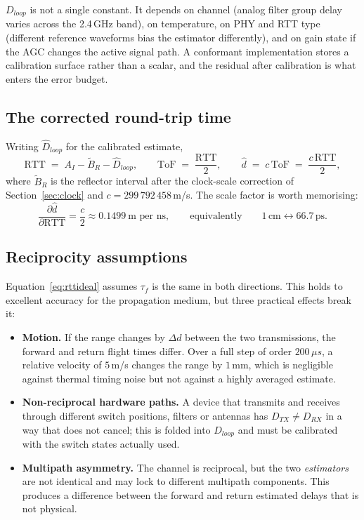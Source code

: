 \documentclass[11pt,a4paper]{article}
\newcommand{\us}{\,\ensuremath{\upmu}s}
\newcommand{\ToF}{\mathrm{ToF}}
\newcommand{\RTT}{\mathrm{RTT}}
\providecommand{\upmu}{\mu}
\begin{document}
$D_{loop}$ is not a single constant. It depends on channel (analog filter group delay varies across
the 2.4\,GHz band), on temperature, on PHY and RTT type (different reference waveforms bias the
estimator differently), and on gain state if the AGC changes the active signal path. A conformant
implementation stores a calibration surface rather than a scalar, and the residual after
calibration is what enters the error budget.

\subsection{The corrected round-trip time}

Writing $\hat D_{loop}$ for the calibrated estimate,
\begin{equation}
\RTT \;=\; A_I - \tilde B_R - \hat D_{loop},
\qquad
\ToF \;=\; \frac{\RTT}{2},
\qquad
\hat d \;=\; c\,\ToF \;=\; \frac{c\,\RTT}{2},
\label{eq:rttfinal}
\end{equation}
where $\tilde B_R$ is the reflector interval after the clock-scale correction of
Section~\ref{sec:clock} and $c = 299\,792\,458$\,m/s. The scale factor is worth memorising:
\begin{equation}
\frac{\partial \hat d}{\partial \RTT} = \frac{c}{2} \approx 0.1499\ \text{m per ns},
\qquad\text{equivalently}\qquad 1\,\text{cm} \leftrightarrow 66.7\,\text{ps}.
\label{eq:scale}
\end{equation}

\subsection{Reciprocity assumptions}

Equation~\eqref{eq:rttideal} assumes $\tau_f$ is the same in both directions. This holds to
excellent accuracy for the propagation medium, but three practical effects break it:

\begin{itemize}[leftmargin=1.4em,itemsep=1pt]
  \item \textbf{Motion.} If the range changes by $\Delta d$ between the two transmissions, the
    forward and return flight times differ. Over a full step of order $200\us$, a relative velocity
    of $5$\,m/s changes the range by $1$\,mm, which is negligible against thermal timing noise but
    not against a highly averaged estimate.
  \item \textbf{Non-reciprocal hardware paths.} A device that transmits and receives through
    different switch positions, filters or antennas has $D_{TX}\neq D_{RX}$ in a way that does not
    cancel; this is folded into $D_{loop}$ and must be calibrated with the switch states actually
    used.
  \item \textbf{Multipath asymmetry.} The channel is reciprocal, but the two \emph{estimators} are
    not identical and may lock to different multipath components. This produces a difference
    between the forward and return estimated delays that is not physical.
\end{itemize}
\end{document}
